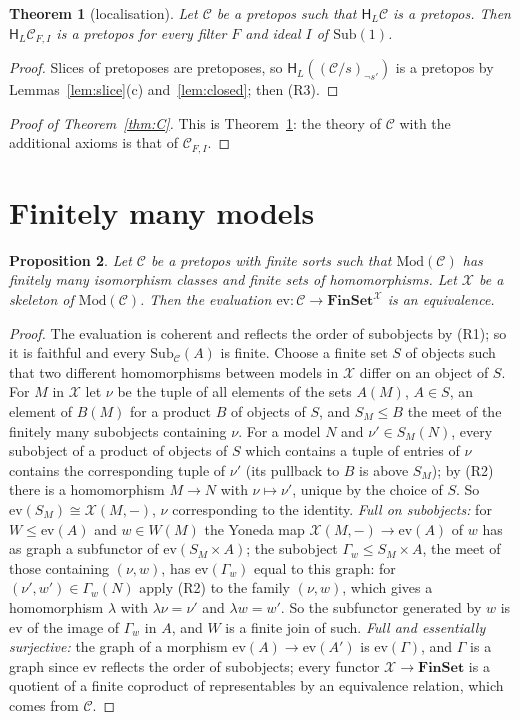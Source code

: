 \documentclass[11pt]{amsart}
\newtheorem{thm}{Theorem}[section]
\newtheorem{prop}[thm]{Proposition}
\theoremstyle{definition}
\newcommand{\Fin}{\mathbf{FinSet}}
\newcommand{\Sub}{\mathrm{Sub}}
\newcommand{\Mod}{\mathrm{Mod}}
\newcommand{\HH}{\mathsf H}
\newcommand{\cX}{\mathcal X}
\newcommand{\cC}{\mathcal C}
\begin{document}
\begin{thm}[localisation]\label{thm:loc}
Let $\cC$ be a pretopos such that $\HH_L\cC$ is a pretopos. Then
$\HH_L\cC_{F,I}$ is a pretopos for every filter $F$ and ideal $I$ of
$\Sub(1)$.
\end{thm}
\begin{proof}
Slices of pretoposes are pretoposes, so $\HH_L((\cC/s)_{\neg s'})$ is a
pretopos by Lemmas~\ref{lem:slice}(c) and~\ref{lem:closed}; then (R3).
\end{proof}


\begin{proof}[Proof of Theorem~\ref{thm:C}]
This is Theorem~\ref{thm:loc}: the theory of $\cC$ with the additional
axioms is that of $\cC_{F,I}$.
\end{proof}

\section{Finitely many models}

\begin{prop}\label{prop:finmod}
Let $\cC$ be a pretopos with finite sorts such that $\Mod(\cC)$ has
finitely many isomorphism classes and finite sets of homomorphisms.
Let $\cX$ be a skeleton of $\Mod(\cC)$. Then the evaluation
$\mathrm{ev}\colon\cC\to\Fin^\cX$ is an equivalence.
\end{prop}
\begin{proof}
The evaluation is coherent and reflects the order of subobjects by
(R1); so it is faithful and every $\Sub_\cC(A)$ is finite. Choose a
finite set $S$ of objects such that two different homomorphisms
between models in $\cX$ differ on an object of $S$. For $M$ in $\cX$
let $\nu$ be the tuple of all elements of the sets $A(M)$, $A\in S$,
an element of $B(M)$ for a product $B$ of objects of $S$, and $S_M\le
B$ the meet of the finitely many subobjects containing $\nu$. For a
model $N$ and $\nu'\in S_M(N)$, every subobject of a product of
objects of $S$ which contains a tuple of entries of $\nu$ contains the
corresponding tuple of $\nu'$ (its pullback to $B$ is above $S_M$); by
(R2) there is a homomorphism $M\to N$ with $\nu\mapsto\nu'$, unique by
the choice of $S$. So $\mathrm{ev}(S_M)\cong\cX(M,-)$, $\nu$
corresponding to the identity. \emph{Full on subobjects:} for $W\le
\mathrm{ev}(A)$ and $w\in W(M)$ the Yoneda map $\cX(M,-)\to
\mathrm{ev}(A)$ of $w$ has as graph a subfunctor of $\mathrm{ev}(S_M
\times A)$; the subobject $\Gamma_w\le S_M\times A$, the meet of those
containing $(\nu,w)$, has $\mathrm{ev}(\Gamma_w)$ equal to this graph:
for $(\nu',w')\in\Gamma_w(N)$ apply (R2) to the family $(\nu,w)$, which
gives a homomorphism $\lambda$ with $\lambda\nu=\nu'$ and $\lambda
w=w'$. So the subfunctor generated by $w$ is $\mathrm{ev}$ of the
image of $\Gamma_w$ in $A$, and $W$ is a finite join of such. \emph{Full
and essentially surjective:} the graph of a morphism $\mathrm{ev}(A)
\to\mathrm{ev}(A')$ is $\mathrm{ev}(\Gamma)$, and $\Gamma$ is a graph
since $\mathrm{ev}$ reflects the order of subobjects; every functor
$\cX\to\Fin$ is a quotient of a finite coproduct of representables by
an equivalence relation, which comes from $\cC$.
\end{proof}
\end{document}
